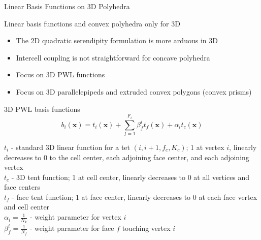 \documentclass[compress,10pt]{beamer}
\renewcommand{\vec}[1]{\mathbf{#1}}
\begin{document}
\begin{frame}[t]{Linear Basis Functions on 3D Polyhedra}
\begin{block}{Linear basis functions and convex polyhedra only for 3D}{\small
\begin{itemize}
\item The 2D quadratic serendipity formulation is more arduous in 3D
\item Intercell coupling is not straightforward for concave polyhedra
\item Focus on 3D PWL functions
\item Focus on 3D parallelepipeds and extruded convex polygons (convex prisms)
\end{itemize}}
\end{block}
\begin{block}{3D PWL basis functions}{\small
\begin{equation*}
b_i (\vec{x})  = t_i  (\vec{x})  + \sum_{f=1}^{F_i} \beta_f^i  t_f (\vec{x}) + \alpha_i t_c  (\vec{x}) 
\end{equation*}
}\end{block}
\begin{block}{}{\footnotesize
$t_i$ - standard 3D linear function for a tet $(i,i+1,f_c,K_c)$; 1 at vertex $i$, linearly decreases to 0 to the cell center, each adjoining face center, and each adjoining vertex\\ \vspace{0.5mm}
$t_c$ - 3D tent function; 1 at cell center, linearly decreases to 0 at all vertices and face centers \\ \vspace{0.5mm}
$t_f$ - face tent function; 1 at face center, linearly decreases to 0 at each face vertex and cell center\\ \vspace{0.5mm}
$\alpha_i = \frac{1}{N_V}$ - weight parameter for vertex $i$\\ \vspace{0.5mm}
$\beta_f^i = \frac{1}{N_f}$ - weight parameter for face $f$ touching vertex $i$
}\end{block}
\end{frame}
\end{document}
